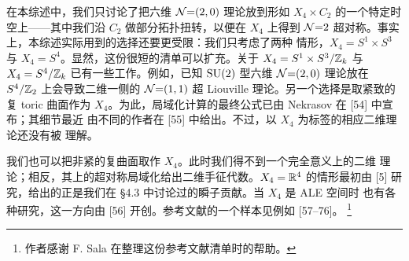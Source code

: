 在本综述中，我们只讨论了把六维 $\mathcal{N}{=}(2,0)$ 理论放到形如 $X_4\times C_2$
的一个特定时空上——其中我们沿 $C_2$ 做部分拓扑扭转，以便在 $X_4$ 上得到
$\mathcal{N}{=}2$ 超对称。事实上，本综述实际用到的选择还要更受限：我们只考虑了两种
情形，$X_4=S^1\times S^3$ 与 $X_4=S^4$。显然，这份很短的清单可以扩充。关于
$X_4=S^1\times S^3/\mathbb{Z}_k$ 与 $X_4=S^4/\mathbb{Z}_k$ 已有一些工作。例如，已知
$\mathrm{SU}(2)$ 型六维 $\mathcal{N}{=}(2,0)$ 理论放在 $S^4/\mathbb{Z}_2$ 上会导致二维一侧的
$\mathcal{N}{=}(1,1)$ 超 Liouville 理论。另一个选择是取紧致的复 toric 曲面作为
$X_4$。为此，局域化计算的最终公式已由 Nekrasov 在 [54] 中宣布；其细节最近%
由不同的作者在 [55] 中给出。不过，以 $X_4$ 为标签的相应二维理论还没有被
理解。


我们也可以把非紧的复曲面取作 $X_4$。此时我们得不到一个完全意义上的二维
理论；相反，其上的超对称局域化给出二维手征代数。$X_4=\mathbb{R}^4$ 的情形最初由
[5] 研究，给出的正是我们在 §4.3 中讨论过的瞬子贡献。当 $X_4$ 是 ALE 空间时
也有各种研究，这一方向由 [56] 开创。参考文献的一个样本见例如 [57--76]。%
\footnote{作者感谢 F. Sala 在整理这份参考文献清单时的帮助。}


